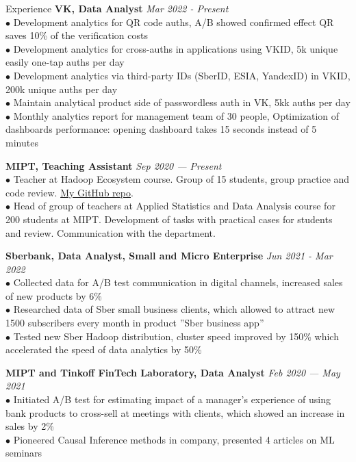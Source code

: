 \documentclass{resume} %
\begin{document}
\begin{rSection}{ Experience }
    { \bf VK, Data Analyst} \hfill {\em Mar 2022 - Present}\\
    { $\bullet$ Development analytics for QR code auths, A/B showed confirmed effect QR saves 10\% of the verification costs} \\
    { $\bullet$ Development analytics for cross-auths in applications using VKID, 5k unique easily one-tap auths per day}\\
    { $\bullet$ Development analytics via third-party IDs (SberID, ESIA, YandexID) in VKID, 200k unique auths per day}\\
    { $\bullet$ Maintain analytical product side of passwordless auth in VK, 5kk auths per day }\\
    { $\bullet$ Monthly analytics report for management team of 30 people, Optimization of dashboards performance: opening dashboard takes 15 seconds instead of 5 minutes}
    
    { \bf MIPT, Teaching Assistant} \hfill {\em Sep 2020 — Present}\\
    { $\bullet$ Teacher at Hadoop Ecosystem course. Group of 15 students, group practice and code review. \href{https://github.com/YHx07/pd-seminars}{My GitHub repo}.}\\
    { $\bullet$ Head of group of teachers at Applied Statistics and Data Analysis course for 200 students at MIPT. Development of tasks with practical cases for students and review. Communication with the department. }

    { \bf Sberbank, Data Analyst, Small and Micro Enterprise} \hfill {\em Jun 2021 - Mar 2022}\\
    { $\bullet$ Collected data for A/B test communication in digital channels, increased sales of new products by 6\% }\\
    { $\bullet$ Researched data of Sber small business clients, which allowed to attract new 1500 subscribers every month in product ''Sber business app'' }\\
    { $\bullet$ Tested new Sber Hadoop distribution, cluster speed improved by 150\% which accelerated the speed of data analytics by 50\%}
    
    { \bf MIPT and Tinkoff FinTech Laboratory, Data Analyst } \hfill {\em Feb 2020 — May 2021}\\
    { $\bullet$ Initiated A/B test for estimating impact of a manager's experience of using bank products to cross-sell at meetings with clients, which showed an increase in sales by 2\% }\\
    { $\bullet$ Pioneered Causal Inference methods in company, presented 4 articles on ML seminars }

\end{rSection}
\end{document}
